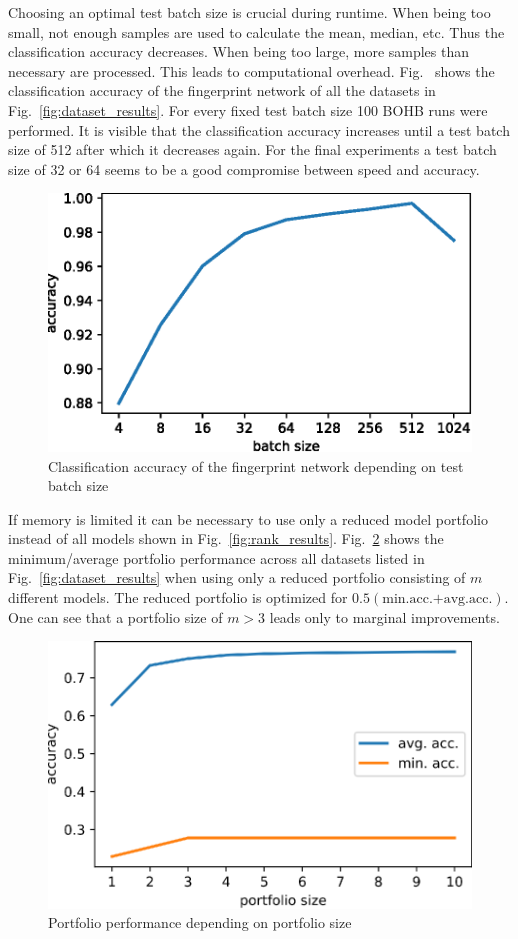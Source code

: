 \documentclass{article}
\begin{document}
Choosing an optimal test batch size is crucial during runtime. When being too small, not enough samples are used to calculate the mean, median, etc. Thus the classification accuracy decreases. When being too large, more samples than necessary are processed. This leads to computational overhead. Fig.~ shows the classification accuracy of the fingerprint network of all the datasets in Fig.~\ref{fig:dataset_results}. For every fixed test batch size 100 BOHB runs were performed. It is visible that the classification accuracy increases until a test batch size of 512 after which it decreases again. For the final experiments a test batch size of 32 or 64 seems to be a good compromise between speed and accuracy. 
%
\begin{figure}[htb]
\begin{center}
 	\includegraphics[width=0.7\linewidth]{../figures/batch_size_acc.eps} 
\end{center}
\caption{Classification accuracy of the fingerprint network depending on test batch size}
\label{fig:batch_size_acc}
\end{figure} 
%

If memory is limited it can be necessary to use only a reduced model portfolio instead of all models shown in Fig.~\ref{fig:rank_results}. Fig.~\ref{fig:portfolio_performance} shows the minimum/average portfolio performance across all datasets listed in Fig.~\ref{fig:dataset_results} when using only a reduced portfolio consisting of $m$ different models. The reduced portfolio is optimized for $0.5(\text{min.acc.+avg.acc.})$. One can see that a portfolio size of $m>3$ leads only to marginal improvements.
%
\begin{figure}[htb]
\begin{center}
 	\includegraphics[width=0.7\linewidth]{../figures/portfolio_performance.eps} 
\end{center}
\caption{Portfolio performance depending on portfolio size}
\label{fig:portfolio_performance}
\end{figure} 
%




\end{document}
